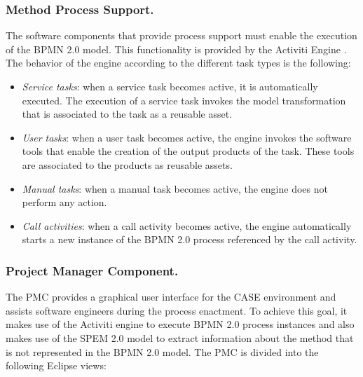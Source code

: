 \documentclass[runningheads,a4paper]{llncs}
\begin{document}
\subsubsection{Method Process Support.}

The software components that provide process support must enable the execution
of the BPMN 2.0 model. This functionality is provided by the Activiti Engine
\cite{activiti}. The behavior of the engine according to the different task
types is the following:

\begin{itemize}
  \item \emph{Service tasks}: when a service task becomes active, it is
  automatically executed. The execution of a service task invokes the model
  transformation that is associated to the task as a reusable asset.
  \item \emph{User tasks}: when a user task becomes active, the engine invokes
  the software tools that enable the creation of the output products of the
  task. These tools are associated to the products as reusable assets.
  \item \emph{Manual tasks}: when a manual task becomes active, the engine does
  not perform any action.
  \item \emph{Call activities}: when a call activity becomes active, the engine
  automatically starts a new instance of the BPMN 2.0 process referenced by the
  call activity.
\end{itemize}

\subsubsection{Project Manager Component.}

The PMC provides a graphical user interface for the
CASE environment and assists software engineers during the process enactment. To
achieve this goal, it makes use of the Activiti engine to execute BPMN 2.0
process instances and also makes use of the SPEM 2.0 model to extract
information about the method that is not represented in the BPMN 2.0 model. The
PMC is divided into the following Eclipse views:
\end{document}
